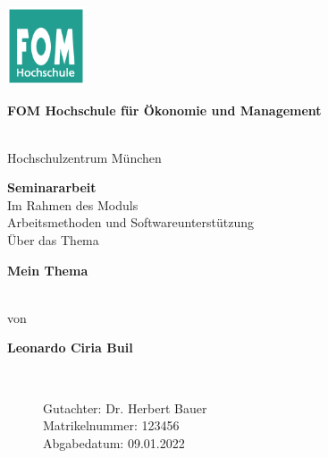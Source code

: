 \newcommand{\Thema}{Mein Thema}
\newcommand{\Name}{Leonardo Ciria Buil}
\newcommand{\Gutachter}{Dr. Herbert Bauer}
\newcommand{\Matrikelnummer}{123456}
\newcommand{\Abgabedatum}{09.01.2022}




\begin{titlepage}
	\begin{center}
		\includegraphics[width=2.3cm]{assets/fomLogo.pdf}\\
		\vspace{.5cm}
		\begin{Large}\textbf{FOM Hochschule für Ökonomie und Management}\end{Large}\\
		\vspace{.5cm}
		Hochschulzentrum München

		\vspace{2cm}
	\end{center}

	\bigskip

	\begin{center}
		\textbf{Seminararbeit}\\
		\vspace{0.2cm}
		Im Rahmen des Moduls\\
		\vspace{0.5cm}
		Arbeitsmethoden und Softwareunterstützung\\
		\vspace{2cm}
		Über das Thema\\
		\vspace{0.5cm}
		\begin{Large}\textbf{\textbf{\Thema}}\end{Large}\\

		\vspace{2cm}
		von\\
		\vspace{0.5cm}
		\begin{Large}\textbf{\textbf{\Name}}\end{Large}\\
	\end{center}

	\begin{figure}[b]

		Gutachter: \Gutachter       \\
		Matrikelnummer: \Matrikelnummer \\
		Abgabedatum: \Abgabedatum
	\end{figure}

\end{titlepage}